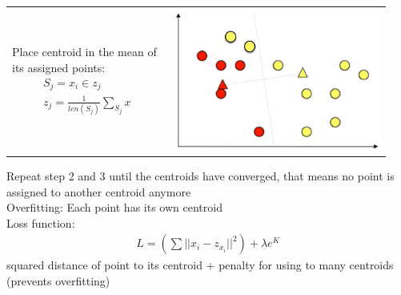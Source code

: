 \begin{tabular}{m{0.4\linewidth} | m{0.54\linewidth}}
        \hline
        Place centroid in the mean of its assigned points:
        \begin{align*}
            S_j = x_i \in z_j\\
            z_j = \frac{1}{len(S_j)} \sum_{S_j} x
        \end{align*}    
        & \begin{minipage}{\linewidth}\includegraphics[width = \linewidth]{src/8_ml/images/cluster_move_centroids.png}\end{minipage}\\
    \end{tabular}

    Repeat step 2 and 3 until the centroids have converged, that means no point is assigned to another centroid anymore\\
    Overfitting: Each point has its own centroid\\
    Loss function:
    \begin{align*}
        L = (\sum ||x_i - z_{x_i}||^2) + \lambda e^K
    \end{align*}
    squared distance of point to its centroid + penalty for using to many centroids (prevents overfitting)
